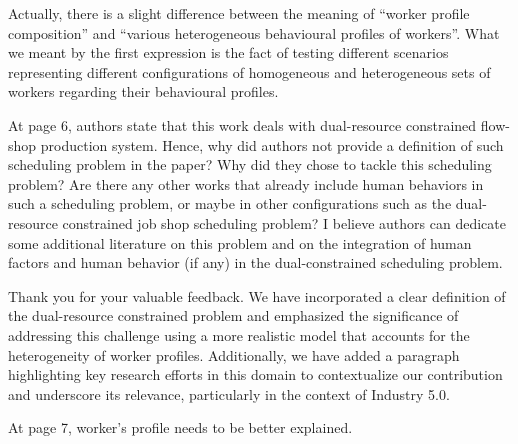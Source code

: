 \documentclass[preprint,11pt,3p]{elsarticle}
\begin{document}
\begin{tcolorbox}[colback=r_color1,colframe=r_color2,title=Response Q5  :]
	Actually, there is a slight difference between the meaning of ``worker profile composition'' and ``various heterogeneous behavioural profiles of workers''. What we meant by the first expression is the fact of testing different scenarios representing different configurations of homogeneous and heterogeneous sets of workers regarding their behavioural profiles.
	
	
	
	
	
	  
\end{tcolorbox}
\begin{tcolorbox}[colback=q_color1,colframe=q_color2,title=Q6  :]	
	At page 6, authors state that this work deals with dual-resource constrained flow-shop production system. Hence,
 why did authors not provide a definition of such scheduling problem in the paper?
 Why did they chose to tackle this scheduling problem?
 Are there any other works that already include human behaviors in such a scheduling problem, or maybe in other configurations such as the dual-resource constrained job shop scheduling problem? 
 I believe authors can dedicate some additional literature on this problem and on the integration of human factors and human behavior (if any) in the dual-constrained scheduling problem.
	
	
\end{tcolorbox}


\begin{tcolorbox}[colback=r_color1,colframe=r_color2,title=Response Q6 :]
Thank you for your valuable feedback. We have incorporated a clear definition of the dual-resource constrained problem and emphasized the significance of addressing this challenge using a more realistic model that accounts for the heterogeneity of worker profiles. Additionally, we have added a paragraph highlighting key research efforts in this domain to contextualize our contribution and underscore its relevance, particularly in the context of Industry 5.0.
			
\end{tcolorbox}
\begin{tcolorbox}[colback=q_color1,colframe=q_color2,title=Q7 :]	
    At page 7, worker's profile needs to be better explained.
\end{tcolorbox}
\end{document}

